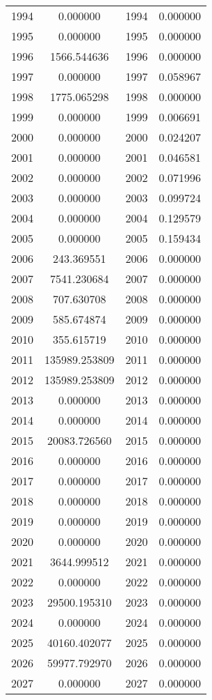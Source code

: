 \documentclass[12pt]{article}
\begin{document}
\begin{longtable}{@{}cccc@{}}
1994 & 0.000000 & 1994 & 0.000000 \\
1995 & 0.000000 & 1995 & 0.000000 \\
1996 & 1566.544636 & 1996 & 0.000000 \\
1997 & 0.000000 & 1997 & 0.058967 \\
1998 & 1775.065298 & 1998 & 0.000000 \\
1999 & 0.000000 & 1999 & 0.006691 \\
2000 & 0.000000 & 2000 & 0.024207 \\
2001 & 0.000000 & 2001 & 0.046581 \\
2002 & 0.000000 & 2002 & 0.071996 \\
2003 & 0.000000 & 2003 & 0.099724 \\
2004 & 0.000000 & 2004 & 0.129579 \\
2005 & 0.000000 & 2005 & 0.159434 \\
2006 & 243.369551 & 2006 & 0.000000 \\
2007 & 7541.230684 & 2007 & 0.000000 \\
2008 & 707.630708 & 2008 & 0.000000 \\
2009 & 585.674874 & 2009 & 0.000000 \\
2010 & 355.615719 & 2010 & 0.000000 \\
2011 & 135989.253809 & 2011 & 0.000000 \\
2012 & 135989.253809 & 2012 & 0.000000 \\
2013 & 0.000000 & 2013 & 0.000000 \\
2014 & 0.000000 & 2014 & 0.000000 \\
2015 & 20083.726560 & 2015 & 0.000000 \\
2016 & 0.000000 & 2016 & 0.000000 \\
2017 & 0.000000 & 2017 & 0.000000 \\
2018 & 0.000000 & 2018 & 0.000000 \\
2019 & 0.000000 & 2019 & 0.000000 \\
2020 & 0.000000 & 2020 & 0.000000 \\
2021 & 3644.999512 & 2021 & 0.000000 \\
2022 & 0.000000 & 2022 & 0.000000 \\
2023 & 29500.195310 & 2023 & 0.000000 \\
2024 & 0.000000 & 2024 & 0.000000 \\
2025 & 40160.402077 & 2025 & 0.000000 \\
2026 & 59977.792970 & 2026 & 0.000000 \\
2027 & 0.000000 & 2027 & 0.000000 \\

\end{longtable}
\end{document}
